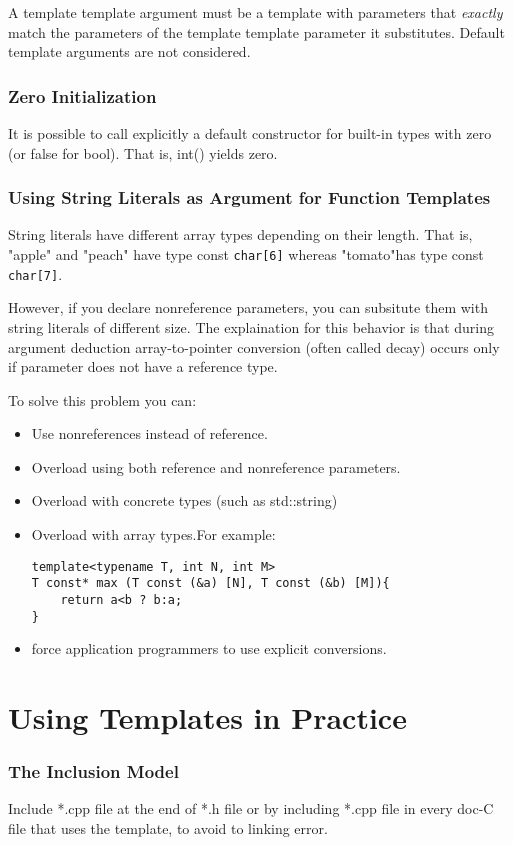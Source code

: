 \documentclass[a4paper,12pt]{book}
\begin{document}
A template template argument must be a template with parameters that \emph{exactly} match the parameters of the template template parameter it substitutes. Default template arguments are not considered.
\subsubsection{Zero Initialization}
It is possible to call explicitly a default constructor for built-in types with zero (or false for bool). That is, int() yields zero.
\subsubsection{Using String Literals as Argument for Function Templates}
String literals have different array types depending on their length. That is, "apple" and "peach" have type const \verb|char[6]| whereas "tomato"has type const \verb|char[7]|. 

However, if you declare nonreference parameters, you can subsitute them with string literals of different size. The explaination for this behavior is that during argument deduction array-to-pointer conversion (often called decay) occurs only if parameter does not have a reference type.

To solve this problem you can:
\begin{itemize}
\item Use nonreferences instead of reference.
\item Overload using both reference and nonreference parameters.
\item Overload with concrete types (such as std::string)
\item Overload with array types.For example:
\begin{verbatim}
template<typename T, int N, int M>
T const* max (T const (&a) [N], T const (&b) [M]){
    return a<b ? b:a;
}
\end{verbatim}
\item force application programmers to use explicit conversions.
\end{itemize}
\section{Using Templates in Practice}
\subsubsection{The Inclusion Model}
Include *.cpp file at the end of *.h file or by including *.cpp file in every doc-C file that uses the template, to avoid to linking error.
\end{document}
